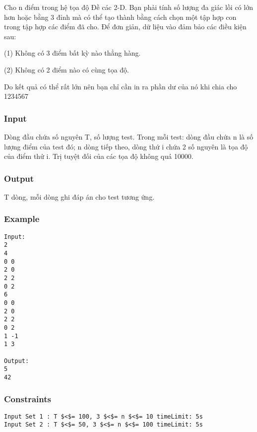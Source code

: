 



   Cho n điểm trong hệ tọa độ Đề các 2-D. Bạn phải tính số lượng đa giác lồi có lớn hơn hoặc bằng 3 đỉnh mà có thể tạo thành bằng cách chọn một tập hợp con trong tập hợp các điểm đã cho. Để đơn giản, dữ liệu vào đảm bảo các điều kiện sau:  
\begin{itemize}

    (1) Không có 3 điểm bất kỳ nào thẳng hàng.   

    (2) Không có 2 điểm nào có cùng tọa độ.   
\end{itemize}

   Do kết quả có thể rất lớn nên bạn chỉ cần in ra phần dư của nó khi chia cho 1234567  

\subsubsection{   Input  }

   Dòng đầu chứa số nguyên T, số lượng test. Trong mỗi test: dòng đầu chứa n là số lượng điểm của test đó; n dòng tiếp theo, dòng thứ i chứa 2 số nguyên là tọa độ của điểm thứ i. Trị tuyệt đối của các tọa độ không quá 10000.  

\subsubsection{   Output  }

   T dòng, mỗi dòng ghi đáp án cho test tương ứng.  

\subsubsection{   Example  }
\begin{verbatim}
Input:
2
4
0 0
2 0
2 2
0 2
6
0 0
2 0
2 2
0 2
1 -1
1 3

Output:
5
42
\end{verbatim}

\subsubsection{   Constraints  }
\begin{verbatim}
Input Set 1 : T $<$= 100, 3 $<$= n $<$= 10 timeLimit: 5s  
Input Set 2 : T $<$= 50, 3 $<$= n $<$= 100 timeLimit: 5s 
\end{verbatim}